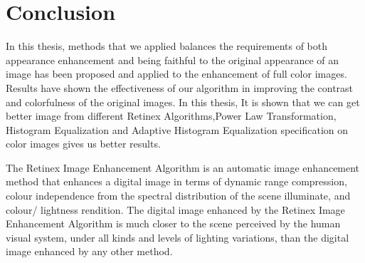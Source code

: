 \chapter{Conclusion}
In this thesis, methods that we applied balances the requirements of both appearance
enhancement and being faithful to the original appearance of an image has been
proposed and applied to the enhancement of full color images. Results have shown
the effectiveness of our algorithm in improving the contrast and colorfulness of
the original images. In this thesis, It is shown that we can get better image
from different Retinex Algorithms,Power Law Transformation, Histogram Equalization and Adaptive Histogram Equalization specification on color images gives us better results.

The Retinex Image Enhancement Algorithm is an automatic image enhancement method that enhances a digital image in terms of dynamic range compression, colour independence from the spectral distribution of the scene illuminate, and colour/ lightness rendition. The digital image enhanced by the Retinex Image Enhancement Algorithm is much closer to the scene perceived by the human visual system, under all kinds and levels of lighting variations, than the digital image enhanced by any other method.
